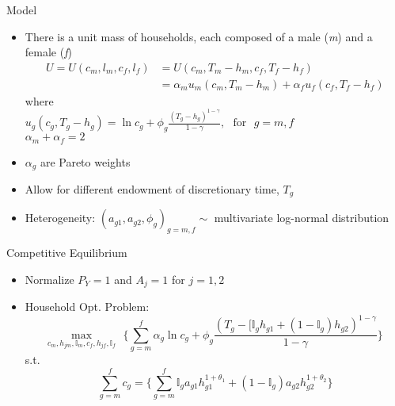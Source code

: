 \documentclass[hyperref={bookmarks=false}]{beamer}
\begin{document}
\begin{frame}{Model}
\begin{itemize}
\setlength{\itemsep}{0.35 cm}
\item There is a unit mass of households, each
composed of a male (\emph{m}) and a female (\emph{f})
\begin{align}
U = U(c_m,l_m,c_f,l_f)&=U(c_m,T_m-h_m,c_f,T_f-h_f)\\ \nonumber
&=\alpha_{m}u_{m}(c_m,T_m-h_m)+\alpha_{f}u_{f}(c_f,T_f-h_f)
\end{align}
where\\
\vfill
$u_g(c_g,T_g-h_g)=\ln c_g + \phi_g \frac{(T_{g}-h_g)^{1-\gamma}}{1-\gamma}, \,\,\,\, \text{for}\,\,\,\, g=m,f$\\
\vfill
$\alpha_{m}+\alpha_{f}=2$
\item $\alpha_g$ are Pareto weights
\item Allow for different endowment of discretionary time, $T_g$
\item Heterogeneity: $(a_{g1},a_{g2},\phi_g)_{g=m,f}\sim$ multivariate log-normal distribution 
\end{itemize}
\end{frame}

\begin{frame}{Competitive Equilibrium}
\begin{itemize}
\setlength{\itemsep}{0.35 cm}
\item Normalize $P_Y=1$ and $A_j=1$ for $j=1,2$
\item Household Opt. Problem:
\begin{equation}
\underset{c_m,h_{jm},\mathbb{I}_m,c_f,h_{jf},\mathbb{I}_f}{\text{max}}\,\,\,\, \Big\{\sum_{g=m}^{f}\alpha_{g}\ln c_{g} + \phi_g \frac{(T_{g}-[\mathbb{I}_{g}h_{g1}+(1-\mathbb{I}_{g})h_{g2})^{1-\gamma}}{1-\gamma} \Big\}
\end{equation}
s.t.
\begin{equation}
\sum_{g=m}^{f}c_g=\Big\{\sum_{g=m}^{f}\mathbb{I}_{g}a_{g1}h_{g1}^{1+\theta_{1}}+(1-\mathbb{I}_g)a_{g2}h_{g2}^{1+\theta_2}\Big\}
\end{equation}
\end{itemize}
\end{frame}
\end{document}
